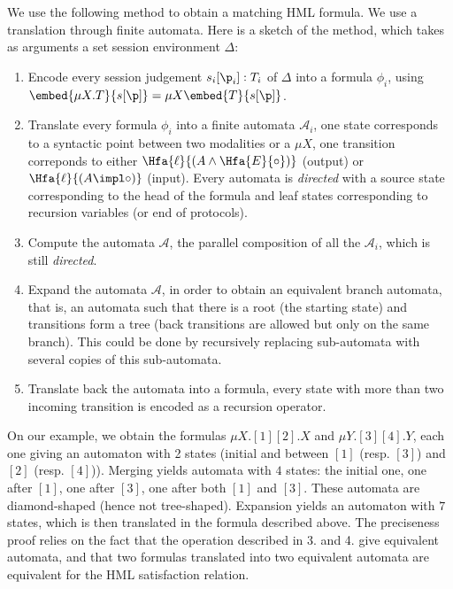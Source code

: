 We use the following method to obtain a matching HML formula. We use a
translation through finite automata. Here is a sketch of the method,
which takes as arguments a set session environment $\Delta$:
\begin{enumerate}
\item Encode every session judgement $s_i[\p_i]:T_i$ of $\Delta$ into
  a formula $\phi_i$, using $\embed{\mu X.T}{s[\p]}=\mu
  X\embed{T}{s[\p]}$.
\item Translate every formula $\phi_i$ into a finite automata
  $\mathcal{A}_i$, one state corresponds to a syntactic point between
  two modalities or a $\mu X$, one transition correponds to either
  $\Hfa{\ell}{(A \land \Hfa{E}{\circ})}$ (output) or $\Hfa{\ell}{(A
    \impl \circ)}$ (input). Every automata is \emph{directed} with a
  source state corresponding to the head of the formula and leaf
  states corresponding to recursion variables (or end of protocols).
\item Compute the automata $\mathcal{A}$, the parallel composition of
  all the $\mathcal{A}_i$, which is still \emph{directed}.
\item Expand the automata $\mathcal{A}$, in order to obtain an
  equivalent branch automata, that is, an automata such that there is
  a root (the starting state) and transitions form a tree (back
  transitions are allowed but only on the same branch). This could be
  done by recursively replacing sub-automata with several copies of
  this sub-automata.
\item Translate back the automata into a formula, every state with
  more than two incoming transition is encoded as a recursion
  operator.
\end{enumerate}

On our example, we obtain the formulas $\mu X.[1][2].X$ and $\mu
Y.[3][4].Y$,
each one giving an automaton with 2 states (initial and between $[1]$
(resp. $[3]$) and $[2]$ (resp. $[4]$)).
Merging yields automata with $4$ states: the initial one, one after
$[1]$, one after $[3]$, one after both $[1]$ and $[3]$. These automata
are diamond-shaped (hence not tree-shaped).
Expansion yields an automaton with $7$ states, which is then translated
in the formula described above.
The preciseness proof relies on the fact that the operation described
in 3. and 4. give equivalent automata, and that two formulas
translated into two equivalent automata are equivalent for the HML
satisfaction relation.












